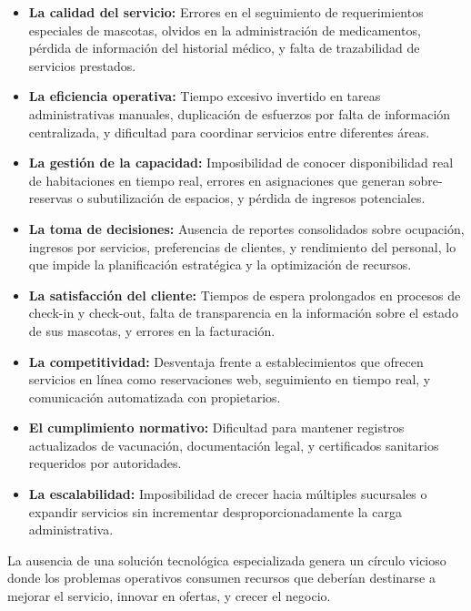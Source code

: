 	\begin{itemize}
		\item \textbf{La calidad del servicio:} Errores en el seguimiento de requerimientos especiales de mascotas, olvidos en la administración de medicamentos, pérdida de información del historial médico, y falta de trazabilidad de servicios prestados.
		
		\item \textbf{La eficiencia operativa:} Tiempo excesivo invertido en tareas administrativas manuales, duplicación de esfuerzos por falta de información centralizada, y dificultad para coordinar servicios entre diferentes áreas.
		
		\item \textbf{La gestión de la capacidad:} Imposibilidad de conocer disponibilidad real de habitaciones en tiempo real, errores en asignaciones que generan sobre-reservas o subutilización de espacios, y pérdida de ingresos potenciales.
		
		\item \textbf{La toma de decisiones:} Ausencia de reportes consolidados sobre ocupación, ingresos por servicios, preferencias de clientes, y rendimiento del personal, lo que impide la planificación estratégica y la optimización de recursos.
		
		\item \textbf{La satisfacción del cliente:} Tiempos de espera prolongados en procesos de check-in y check-out, falta de transparencia en la información sobre el estado de sus mascotas, y errores en la facturación.
		
		\item \textbf{La competitividad:} Desventaja frente a establecimientos que ofrecen servicios en línea como reservaciones web, seguimiento en tiempo real, y comunicación automatizada con propietarios.
		
		\item \textbf{El cumplimiento normativo:} Dificultad para mantener registros actualizados de vacunación, documentación legal, y certificados sanitarios requeridos por autoridades.
		
		\item \textbf{La escalabilidad:} Imposibilidad de crecer hacia múltiples sucursales o expandir servicios sin incrementar desproporcionadamente la carga administrativa.
	\end{itemize}
	
	La ausencia de una solución tecnológica especializada genera un círculo vicioso donde los problemas operativos consumen recursos que deberían destinarse a mejorar el servicio, innovar en ofertas, y crecer el negocio.

